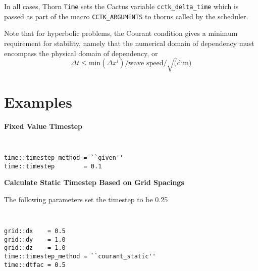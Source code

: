 \documentclass{article}
\begin{document}
In all cases, Thorn {\tt Time} sets the Cactus variable {\tt cctk\_delta\_time}
which is passed as part of the macro {\tt CCTK\_ARGUMENTS} to thorns called 
by the scheduler.

Note that for hyperbolic problems, the Courant condition gives a minimum 
requirement for stability, namely that the numerical domain of dependency
must encompass the physical domain of dependency, or
$$
\Delta t \le \mbox{min}(\Delta x^i)/\mbox{wave speed}/\sqrt(\mbox{dim})
$$

\section{Examples}

{\bf Fixed Value Timestep}

{\tt
\begin{verbatim}
time::timestep_method = ``given''
time::timestep        = 0.1
\end{verbatim}
}


{\bf Calculate Static Timestep Based on Grid Spacings}

The following parameters set the timestep to be 0.25

{\tt
\begin{verbatim}
grid::dx    = 0.5
grid::dy    = 1.0
grid::dz    = 1.0
time::timestep_method = ``courant_static''
time::dtfac = 0.5
\end{verbatim}
}




\end{document}
